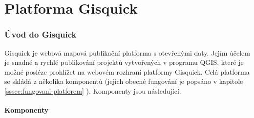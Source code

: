 \newpage
\part{Platforma Gisquick}
\newpage

\section{Úvod do Gisquick}

Gisquick je webová mapová publikační platforma s otevřenými daty. Jejím
účelem je snadné a rychlé publikování projektů vytvořených v programu
QGIS, které je možné posléze prohlížet na webovém rozhraní platformy
Gisquick.
Celá platforma se skládá z několika komponentů (jejich obecné fungování
je popsáno v kapitole \ref{sssec:fungovani-platforem} ). Komponenty jsou
následující.

\subsection{Komponenty}
\label{sssec:gisquick-komponenty}


